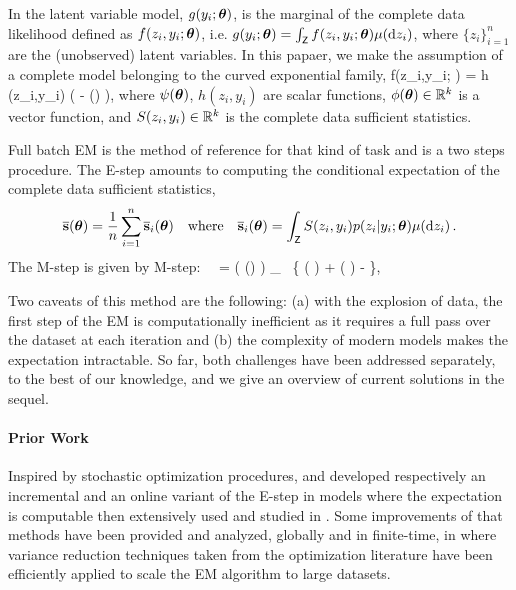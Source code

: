 \documentclass[11pt]{article}
\theoremstyle{t}
\begin{document}
In the latent variable model,  $g(y_i ; {\bm{\theta}})$, is the marginal of the
complete data likelihood defined as $f(z_i,y_i; {\bm{\theta}})$, i.e. $g(y_i; {\bm{\theta}}) = \int_{\mathsf{Z}} f (z_i,y_i;{\bm{\theta}}) \mu(\mathrm d z_i)$, where $\{ z_i \}_{i=1}^n$ are the (unobserved)
latent variables.   
In this papaer, we make the assumption of a complete model belonging to the curved exponential family, \ie
\beq \label{eq:exp}
f(z_i,y_i; \param) = h  (z_i,y_i) \exp \big(  - \psi(\param) \big)\eqs,
\eeq
where $\psi({\bm{\theta}})$, $h(z_i,y_i)$ are scalar functions, $\phi({\bm{\theta}}) \in \mathbb{R}^k$ is a vector function, and $S(z_i,y_i) \in \mathbb{R}^k$ is the complete data sufficient statistics.

Full batch EM \citep{dempster1977Maximum} is the method of reference for that kind of task and is a two steps procedure. The {\sf E-step} amounts to computing the conditional expectation of the complete data sufficient statistics, 
\begin{equation}
\label{eq:definition-overline-bss}
\overline{{\mathbf{s}}}({\bm{\theta}})= \frac{1}{n} \sum_{i=1}^n \overline{{\mathbf{s}}}_i({\bm{\theta}}) \quad  \text{where}  \quad \overline{{\mathbf{s}}}_i({\bm{\theta}})= \int_{\mathsf{Z}} S(z_i,y_i) p(z_i|y_i;{\bm{\theta}}) \mu(\mathrm d z_i) \,.
\end{equation}
The {\sf M-step} is given by
\beq \label{eq:mstep}
\textsf{M-step:}~~\hat{\param} = \overline{\param}( \overline{\bss}(\param) ) \eqdef \argmin_{ \vartheta \in \Param } ~\big\{ \Pen( \vartheta ) + \psi( \vartheta) - \pscal{ \overline{\bss}(\param)}{ \phi ( \vartheta) } \big\},
\eeq

Two caveats of this method are the following: (a) with the explosion of data, the first step of the EM is computationally inefficient as it requires a full pass over the dataset at each iteration and (b) the complexity of modern models makes the expectation intractable. So far, both challenges have been addressed separately, to the best of our knowledge, and we give an overview of current solutions in the sequel.

\paragraph{Prior Work} Inspired by stochastic optimization procedures, \citep{neal1998view} and \citep{cappe2009line} developed respectively an incremental and an online variant of the \textsf{E-step} in models where the expectation is computable then extensively used and studied in \citep{nguyen2020mini, liang2009online,cappe2011online}.
Some improvements of that methods have been provided and analyzed, globally and in finite-time, in \citep{karimi2019global} where variance reduction techniques taken from the optimization literature have been efficiently applied to scale the EM algorithm to large datasets.
\end{document}
